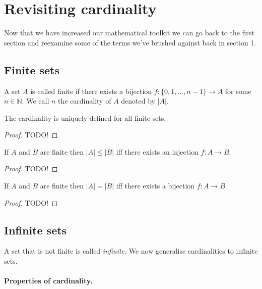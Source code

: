 \documentclass[nobib,nofonts]{tufte-handout}
\begin{document}
\section{Revisiting cardinality}

Now that we have increased our mathematical toolkit we can go back to the first section
and reexamine some of the terms we've brushed against back in section 1.

\subsection{Finite sets}

A set $A$ is called finite if there exists a bijection $f:\{0, 1, ..., n - 1\} \rightarrow A$ for some $n \in \mathbb{N}$.
We call $n$ the cardinality of $A$ denoted by $|A|$.

\begin{proposition}
The cardinality is uniquely defined for all finite sets.
\end{proposition}

\begin{proof}
TODO!
\end{proof}

\begin{proposition}
If $A$ and $B$ are finite then $|A| \leq |B|$ iff there exists an injection $f: A \rightarrow B$.
\end{proposition}

\begin{proof}
TODO!
\end{proof}

\begin{proposition}
If $A$ and $B$ are finite then $|A| = |B|$ iff there exists a bijection $f: A \rightarrow B$.
\end{proposition}

\begin{proof}
TODO!
\end{proof}

\subsection{Infinite sets}

A set that is not finite is called \emph{infinite}.
We now generalise cardinalities to infinite sets.

\paragraph{Properties of cardinality.}
\end{document}
